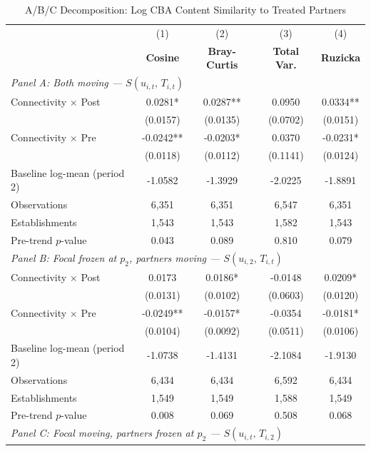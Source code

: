 \begin{table}[H]
\centering
\caption{A/B/C Decomposition: Log CBA Content Similarity to Treated Partners}
\label{tab:abc_decomposition_ln_cba_similarity}
\scriptsize
\setlength{\tabcolsep}{8pt}
\begin{tabular}{lcccc}
\hline\hline
 & (1) & (2) & (3) & (4) \\
 & \textbf{Cosine} & \textbf{Bray-Curtis} & \textbf{Total Var.} & \textbf{Ruzicka} \\
\hline
\multicolumn{5}{l}{\textit{Panel A: Both moving  ---  $S(u_{i,t},\, T_{i,t})$}} \\
Connectivity $\times$ Post & 0.0281* & 0.0287** & 0.0950 & 0.0334** \\
 & (0.0157) & (0.0135) & (0.0702) & (0.0151) \\
Connectivity $\times$ Pre & -0.0242** & -0.0203* & 0.0370 & -0.0231* \\
 & (0.0118) & (0.0112) & (0.1141) & (0.0124) \\
Baseline log-mean (period 2) & -1.0582 & -1.3929 & -2.0225 & -1.8891 \\
Observations &        6,351 &        6,351 &        6,547 &        6,351 \\
Establishments &        1,543 &        1,543 &        1,582 &        1,543 \\
Pre-trend $p$-value & 0.043 & 0.089 & 0.810 & 0.079 \\
\hline
\multicolumn{5}{l}{\textit{Panel B: Focal frozen at $p_2$, partners moving  ---  $S(u_{i,2},\, T_{i,t})$}} \\
Connectivity $\times$ Post & 0.0173 & 0.0186* & -0.0148 & 0.0209* \\
 & (0.0131) & (0.0102) & (0.0603) & (0.0120) \\
Connectivity $\times$ Pre & -0.0249** & -0.0157* & -0.0354 & -0.0181* \\
 & (0.0104) & (0.0092) & (0.0511) & (0.0106) \\
Baseline log-mean (period 2) & -1.0738 & -1.4131 & -2.1084 & -1.9130 \\
Observations &        6,434 &        6,434 &        6,592 &        6,434 \\
Establishments &        1,549 &        1,549 &        1,588 &        1,549 \\
Pre-trend $p$-value & 0.008 & 0.069 & 0.508 & 0.068 \\
\hline
\multicolumn{5}{l}{\textit{Panel C: Focal moving, partners frozen at $p_2$  ---  $S(u_{i,t},\, T_{i,2})$}} \\

\end{tabular}
\end{table}
